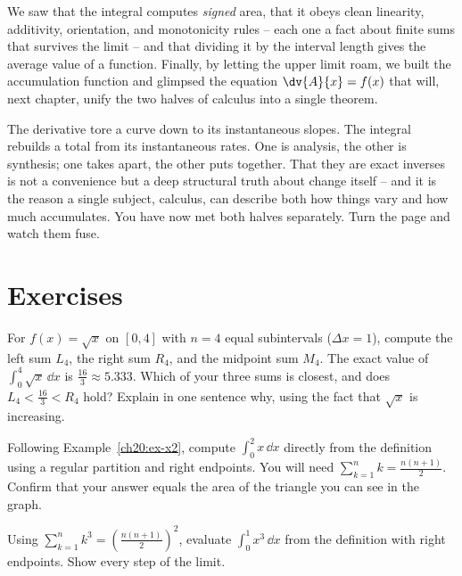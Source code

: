 We saw that the integral computes \emph{signed} area, that it obeys clean
linearity, additivity, orientation, and monotonicity rules -- each one a fact
about finite sums that survives the limit -- and that dividing it by the interval
length gives the average value of a function. Finally, by letting the upper limit
roam, we built the accumulation function and glimpsed the equation
$\dv{A}{x}=f(x)$ that will, next chapter, unify the two halves of calculus into a
single theorem.

\begin{aestheticbox}
The derivative tore a curve down to its instantaneous slopes. The integral
rebuilds a total from its instantaneous rates. One is analysis, the other is
synthesis; one takes apart, the other puts together. That they are exact inverses
is not a convenience but a deep structural truth about change itself -- and it is
the reason a single subject, calculus, can describe both how things vary and how
much accumulates. You have now met both halves separately. Turn the page and
watch them fuse.
\end{aestheticbox}

\section{Exercises}
\label{ch20:exercises}

\begin{exercise}
For $f(x) = \sqrt{x}$ on $[0,4]$ with $n=4$ equal subintervals
($\Delta x = 1$), compute the left sum $L_4$, the right sum $R_4$, and the
midpoint sum $M_4$. The exact value of $\int_0^4 \sqrt{x}\,\dd x$ is
$\tfrac{16}{3}\approx 5.333$. Which of your three sums is closest, and does
$L_4 < \tfrac{16}{3} < R_4$ hold? Explain in one sentence why, using the fact
that $\sqrt{x}$ is increasing.
\end{exercise}

\begin{exercise}
Following Example~\ref{ch20:ex-x2}, compute $\int_0^2 x\,\dd x$ directly from the
definition using a regular partition and right endpoints. You will need
$\sum_{k=1}^n k = \tfrac{n(n+1)}{2}$. Confirm that your answer equals the area of
the triangle you can see in the graph.
\end{exercise}

\begin{exercise}
Using $\sum_{k=1}^n k^3 = \left(\tfrac{n(n+1)}{2}\right)^2$, evaluate
$\int_0^1 x^3\,\dd x$ from the definition with right endpoints. Show every step
of the limit.
\end{exercise}

